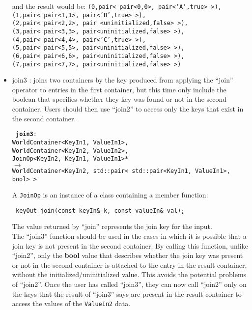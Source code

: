 \documentclass{article}
\begin{document}
\begin{itemize}
  and the result would be: {\tt (0,pair< pair<0,0>, pair<'A',true> >),\\ 
    (1,pair< pair<1,1>, pair<'B',true> >),\\ (2,pair< pair<2,2>, pair <uninitialized,false> >),\\
     (3,pair< pair<3,3>, pair<uninitialized,false> >),\\
     (4,pair< pair<4,4>, pair<'C',true> >),\\
     (5,pair< pair<5,5>, pair<uninitialized,false> >),\\
     (6,pair< pair<6,6>, pair<uninitialized,false> >),\\
     (7,pair< pair<7,7>, pair<uninitialized,false> >)\\ }
 
  \item join3 : joins two containers by the key produced from applying the
``join'' operator to entries in the first container, but this time only
include the boolean that specifies whether they key was found or not in the
second container. Users should then use ``join2'' to access only the keys
that exist in the second container.

    {\tt
    {\bf join3}:\\
    WorldContainer<KeyIn1, ValueIn1>,\\
    WorldContainer<KeyIn2, ValueIn2>,\\
    JoinOp<KeyIn2, KeyIn1, ValueIn1>*\\
    $\rightarrow$\\
    WorldContainer<KeyIn2, std::pair< std::pair<KeyIn1, ValueIn1>, bool> >\\
    }

    A {\tt JoinOp} is an instance of a class containing a member function:

    {\tt
    keyOut join(const keyIn\& k, const valueIn\& val);\\
    }

    The value returned by ``join'' represents the join key for the input.\\

    The ``join3'' function should be used in the cases in which it is
possible that a join key is not present in the second container. By calling
this function, unlike ``join2'', only the {\bf bool} value that describes
whether the join key was present or not in the second container is attached
to the entry in the result container, without the initialized/uninitialized
value.  This avoids the potential problems of ``join2''. Once the user has
called ``join3'', they can now call ``join2'' only on the keys that the
result of ``join3'' says are present in the result container to access the
values of the {\tt ValueIn2} data.\\
   

\end{itemize}
\end{document}
